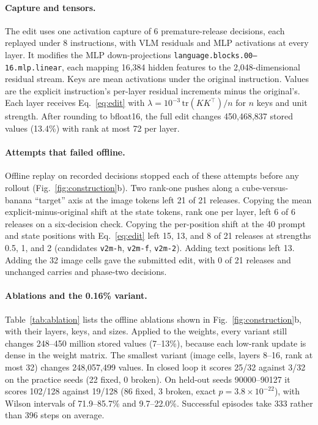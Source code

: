 \documentclass{article}
\begin{document}
\paragraph{Capture and tensors.} The edit uses one activation capture of 6 premature-release decisions, each replayed under 8 instructions, with VLM residuals and MLP activations at every layer. It modifies the MLP down-projections \texttt{language.blocks.00--16.mlp.linear}, each mapping 16,384 hidden features to the 2,048-dimensional residual stream. Keys are mean activations under the original instruction. Values are the explicit instruction's per-layer residual increments minus the original's. Each layer receives Eq.~\eqref{eq:edit} with $\lambda=10^{-3}\,\mathrm{tr}(KK^{\top})/n$ for $n$ keys and unit strength. After rounding to bfloat16, the full edit changes 450,468,837 stored values (13.4\%) with rank at most 72 per layer.

\paragraph{Attempts that failed offline.} Offline replay on recorded decisions stopped each of these attempts before any rollout (Fig.~\ref{fig:construction}b). Two rank-one pushes along a cube-versus-banana ``target'' axis at the image tokens left 21 of 21 releases. Copying the mean explicit-minus-original shift at the state tokens, rank one per layer, left 6 of 6 releases on a six-decision check. Copying the per-position shift at the 40 prompt and state positions with Eq.~\eqref{eq:edit} left 15, 13, and 8 of 21 releases at strengths 0.5, 1, and 2 (candidates \texttt{v2m-h}, \texttt{v2m-f}, \texttt{v2m-2}). Adding text positions left 13. Adding the 32 image cells gave the submitted edit, with 0 of 21 releases and unchanged carries and phase-two decisions.

\paragraph{Ablations and the 0.16\% variant.} Table~\ref{tab:ablation} lists the offline ablations shown in Fig.~\ref{fig:construction}b, with their layers, keys, and sizes. Applied to the weights, every variant still changes 248--450 million stored values (7--13\%), because each low-rank update is dense in the weight matrix. The smallest variant (image cells, layers 8--16, rank at most 32) changes 248,057,499 values. In closed loop it scores 25/32 against 3/32 on the practice seeds (22 fixed, 0 broken). On held-out seeds 90000--90127 it scores 102/128 against 19/128 (86 fixed, 3 broken, exact $p=3.8\times10^{-22}$), with Wilson intervals of 71.9--85.7\% and 9.7--22.0\%. Successful episodes take 333 rather than 396 steps on average.
\end{document}
